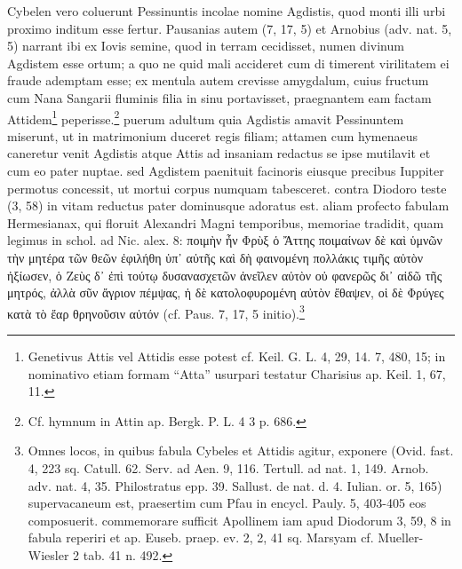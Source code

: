 \documentclass[a4paper, 11pt, oneside, polutonikogreek, german, twocolumn]{article}
\begin{document}
Cybelen vero coluerunt Pessinuntis incolae nomine Agdistis, quod monti illi urbi proximo inditum esse fertur. Pausanias autem (7, 17, 5) et Arnobius (adv. nat. 5, 5) narrant ibi ex Iovis semine, quod in terram cecidisset, numen divinum Agdistem esse ortum; a quo ne quid mali accideret cum di timerent virilitatem ei fraude ademptam esse; ex mentula autem crevisse amygdalum, cuius fructum cum Nana Sangarii fluminis filia in sinu portavisset, praegnantem eam factam Attidem\footnote{Genetivus Attis vel Attidis esse potest cf. Keil. G. L. 4, 29, 14. 7, 480, 15; in nominativo etiam formam "`Atta"' usurpari testatur Charisius ap. Keil. 1, 67, 11.} peperisse.\footnote{Cf. hymnum in Attin ap. Bergk. P. L. 4 3 p. 686.} puerum adultum quia Agdistis amavit Pessinuntem miserunt, ut in matrimonium duceret regis filiam; attamen cum hymenaeus caneretur venit Agdistis atque Attis ad insaniam redactus se ipse mutilavit et cum eo pater nuptae. sed Agdistem paenituit facinoris eiusque precibus Iuppiter permotus concessit, ut mortui corpus numquam tabesceret. contra Diodoro teste (3, 58) in vitam reductus pater dominusque adoratus est. aliam profecto fabulam Hermesianax, qui floruit Alexandri Magni temporibus, memoriae tradidit, quam legimus in schol. ad Nic. alex. 8: ποιμὴν ἦν Φρὺξ ὁ Ἄττης ποιμαίνων δὲ καὶ ὑμνῶν τὴν μητέρα τῶν θεῶν ἐφιλήθη ὑπ᾽ αὐτῆς καὶ δὴ φαινομένη πολλάκις τιμῆς αὐτὸν ἠξίωσεν, ὁ Ζεὺς δ᾽ ἐπὶ τούτῳ δυσανασχετῶν ἀνεῖλεν αὐτὸν οὐ φανερῶς δι᾽ αἰδῶ τῆς μητρός, ἀλλὰ σῦν ἄγριον πέμψας, ἡ δὲ κατολοφυρομένη αὐτὸν ἔθαψεν, οἱ δὲ Φρύγες κατὰ τὸ ἔαρ θρηνοῦσιν αὐτόν (cf. Paus. 7, 17, 5 initio).\footnote{Omnes locos, in quibus fabula Cybeles et Attidis agitur, exponere (Ovid. fast. 4, 223 sq. Catull. 62. Serv. ad Aen. 9, 116. Tertull. ad nat. 1, 149. Arnob. adv. nat. 4, 35. Philostratus epp. 39. Sallust. de nat. d. 4. Iulian. or. 5, 165) supervacaneum est, praesertim cum Pfau in encycl. Pauly. 5, 403-405 eos composuerit. commemorare sufficit Apollinem iam apud Diodorum 3, 59, 8 in fabula reperiri et ap. Euseb. praep. ev. 2, 2, 41 sq. Marsyam cf. Mueller-Wiesler 2 tab. 41 n. 492.}
\end{document}
